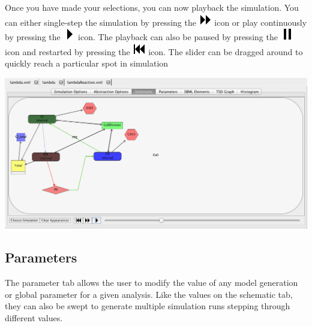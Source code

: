 \documentclass[titlepage,11pt]{article}
\begin{document}
Once you have made your selections, you can now playback the simulation.  You can either single-step the simulation by pressing the \includegraphics{../gui/icons/modelview/movie/single_step} icon or play continuously by pressing the \includegraphics{../gui/icons/modelview/movie/play} icon.  The playback can also be paused by pressing the \includegraphics{../gui/icons/modelview/movie/pause} icon and restarted by pressing the  \includegraphics{../gui/icons/modelview/movie/rewind} icon.  The slider can be dragged around to quickly reach a particular spot in simulation

\begin{center}
\includegraphics[width=160mm]{screenshots/movieView}
\end{center}

\clearpage

\subsection{\label{AnalysisParameters}Parameters}

\noindent
The parameter tab allows the user to modify the value of any model generation or global parameter for a given analysis.  Like the values on the schematic tab, they can also be swept to generate multiple simulation runs stepping through different values.
\end{document}
